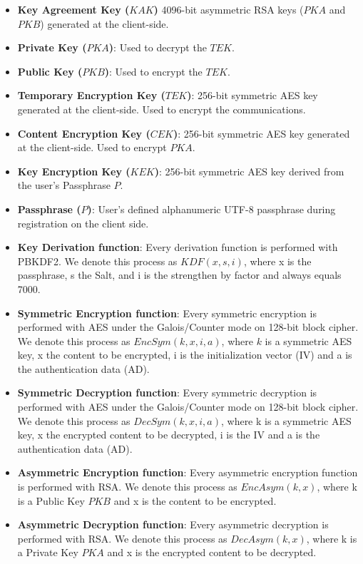 \documentclass[a4paper,10pt]{article}
\begin{document}
\begin{itemize}
    \item \textbf{Key Agreement Key ($KAK$)}
    4096-bit asymmetric RSA keys ($PKA$ and $PKB$) generated at the client-side.
    \item \textbf{Private Key ($PKA$)}:
    Used to decrypt the $TEK$.
    \item \textbf{Public Key ($PKB$)}:
    Used to encrypt the $TEK$.
    \item \textbf{Temporary Encryption Key ($TEK$)}:
    256-bit symmetric AES key generated at the client-side. Used to encrypt the communications.
    \item \textbf{Content Encryption Key ($CEK$)}:
    256-bit symmetric AES key generated at the client-side. Used to encrypt $PKA$.
    \item \textbf{Key Encryption Key ($KEK$)}:
    256-bit symmetric AES key derived from the user's Passphrase $P$.
    \item \textbf{Passphrase ($P$)}:
    User's defined alphanumeric UTF-8 passphrase during registration on the client side.
    \item \textbf{Key Derivation function}:
    Every derivation function is performed with PBKDF2. We denote this process as $KDF(x, s, i)$, where x is the passphrase, s the Salt, and i is the strengthen by factor and always equals 7000.
    \item \textbf{Symmetric Encryption function}:
    Every symmetric encryption is performed with AES under the Galois/Counter mode on 128-bit block cipher. We denote this process as $EncSym(k, x, i, a)$, where $k$ is a symmetric AES key, x the content to be encrypted, i is the initialization vector (IV) and a is the authentication data (AD).
    \item \textbf{Symmetric Decryption function}:
    Every symmetric decryption is performed with AES under the Galois/Counter mode on 128-bit block cipher. We denote this process as $DecSym(k,x,i,a)$, where k is a symmetric AES key, x the encrypted content to be decrypted, i is the IV and a is the authentication data (AD).
    \item \textbf{Asymmetric Encryption function}:
    Every asymmetric encryption function is performed with RSA. We denote this process as $EncAsym(k,x)$, where k is a Public Key $PKB$ and x is the content to be encrypted.
    \item \textbf{Asymmetric Decryption function}:
    Every asymmetric decryption is performed with RSA. We denote this process as $DecAsym(k,x)$, where k is a Private Key $PKA$ and x is the encrypted content to be decrypted.
    
\end{itemize}
\end{document}

